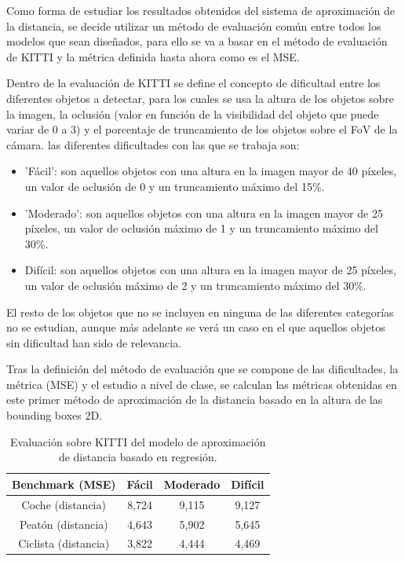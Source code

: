 Como forma de estudiar los resultados obtenidos del sistema de aproximación de la distancia, se decide utilizar un método de evaluación común entre todos los modelos que sean diseñados, para ello se va a basar en el método de evaluación de KITTI y la métrica definida hasta ahora como es el \ac{MSE}.

Dentro de la evaluación de KITTI se define el concepto de dificultad entre los diferentes objetos a detectar, para los cuales se usa la altura de los objetos sobre la imagen, la oclusión (valor en función de la visibilidad del objeto que puede variar de 0 a 3) y el porcentaje de truncamiento de los objetos sobre el \ac{FoV} de la cámara. las diferentes dificultades con las que se trabaja son:
\begin{itemize}
    \item 'Fácil': son aquellos objetos con una altura en la imagen mayor de 40 píxeles, un valor de oclusión de 0 y un truncamiento máximo del 15\%.
    \item 'Moderado': son aquellos objetos con una altura en la imagen mayor de 25 píxeles, un valor de oclusión máximo de 1 y un truncamiento máximo del 30\%.
    \item Difícil: son aquellos objetos con una altura en la imagen mayor de 25 píxeles, un valor de oclusión máximo de 2 y un truncamiento máximo del 30\%.
\end{itemize}
El resto de los objetos que no se incluyen en ninguna de las diferentes categorías no se estudian, aunque más adelante se verá un caso en el que aquellos objetos sin dificultad han sido de relevancia.

Tras la definición del método de evaluación que se compone de las dificultades, la métrica (\ac{MSE}) y el estudio a nivel de clase, se calculan las métricas obtenidas en este primer método de aproximación de la distancia basado en la altura de las bounding boxes 2D.

\begin{table}[H]
\centering
\begin{tabular}{|c|c|c|c|}
\hline
\textbf{Benchmark (MSE)} & \textbf{Fácil} & \textbf{Moderado} & \textbf{Difícil} \\ \hline \hline
Coche (distancia)        & 8,724          & 9,115             & 9,127            \\ \hline
Peatón (distancia)       & 4,643          & 5,902             & 5,645            \\ \hline
Ciclista (distancia)     & 3,822          & 4,444             & 4,469            \\ \hline
\end{tabular}
\caption{Evaluación sobre KITTI del modelo de aproximación de distancia basado en regresión.}
\label{tab:Evaluación sobre KITTI del modelo de aproximación de distancia basado en regresión.}
\end{table}

